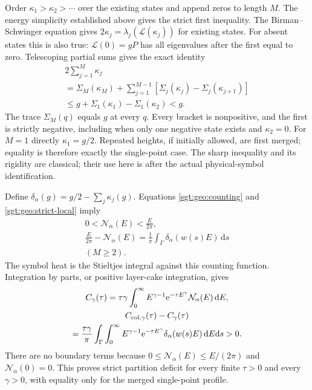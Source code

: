 \documentclass[aps,pra,reprint,superscriptaddress,longbibliography]{revtex4-2}
\newcommand{\dd}{\mathrm d}
\newcommand{\ee}{\mathrm e}
\begin{document}
Order $\kappa_1>\kappa_2>\cdots$ over the existing states and append
zeros to length $M$.  The energy simplicity established above gives
the strict first inequality.  The Birman--Schwinger equation gives
$2\kappa_j=\lambda_j(\mathcal L(\kappa_j))$ for existing states.
For absent states this is also true: $\mathcal L(0)=gP$ has all
eigenvalues after the first equal to zero.  Telescoping partial sums
gives the exact identity
\begin{equation}
\begin{gathered}
 2\sum_{j=1}^M\kappa_j
\\
 =\Sigma_M(\kappa_M)
    +\sum_{j=1}^{M-1}
             [\Sigma_j(\kappa_j)-\Sigma_j(\kappa_{j+1})]
\\
 \leq g+\Sigma_1(\kappa_1)-\Sigma_1(\kappa_2)<g.
 \label{sgt:geo:strict-local}
\end{gathered}
\end{equation}
The trace $\Sigma_M(q)$ equals $g$ at every $q$.  Every bracket is
nonpositive, and the first is strictly negative, including when only
one negative state exists and $\kappa_2=0$.  For $M=1$ directly
$\kappa_1=g/2$.  Repeated heights, if initially allowed, are first
merged; equality is therefore exactly the single-point case.
The sharp inequality and its rigidity are classical; their use here
is after the actual physical-symbol identification.

Define $\delta_\alpha(g)=g/2-\sum_j\kappa_j(g)$.  Equations
\eqref{sgt:geo:counting} and \eqref{sgt:geo:strict-local} imply
\begin{equation}
\begin{gathered}
 0<\mathcal N_\alpha(E)<\frac E{2\pi},\\
 \frac E{2\pi}-\mathcal N_\alpha(E)
       =\frac1\pi\int_\Gamma\delta_\alpha(w(s)E)\,\dd s
 \\
(M\geq2).
 \label{sgt:geo:count-deficit}
\end{gathered}
\end{equation}
The symbol heat is the Stieltjes integral against this counting
function.  Integration by parts, or positive layer-cake integration,
gives
\begin{gather}
 C_\gamma(\tau)=\tau\gamma\int_0^\infty
             E^{\gamma-1}\ee^{-\tau E^\gamma}
             \mathcal N_\alpha(E)\,\dd E,\notag\\
 C_{\mathrm{col},\gamma}(\tau)-C_\gamma(\tau)
\\
 =\frac{\tau\gamma}{\pi}\int_\Gamma\int_0^\infty
 E^{\gamma-1}\ee^{-\tau E^\gamma}\delta_\alpha(w(s)E)
                   \,\dd E\dd s>0.
 \label{sgt:geo:partition-deficit}
\end{gather}
There are no boundary terms because
$0\leq\mathcal N_\alpha(E)\leq E/(2\pi)$ and
$\mathcal N_\alpha(0)=0$.  This proves strict partition deficit for
every finite $\tau>0$ and every $\gamma>0$, with equality only for the
merged single-point profile.
\end{document}
